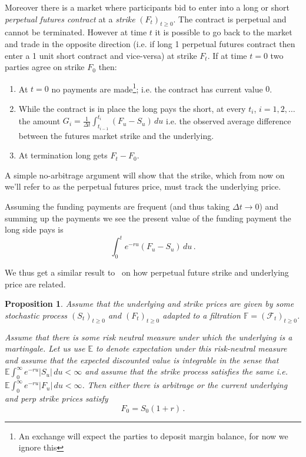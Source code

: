 \documentclass[10pt]{article}
\newtheorem{proposition}{Proposition}
\begin{document}
Moreover there is a market where participants bid to enter into a long or short {\em perpetual futures contract} at a {\em strike} $(F_t)_{t\geq 0}$.  
The contract is perpetual and cannot be terminated. 
However at time $t$ it is possible to go back to the market and trade in the opposite direction (i.e. if long 1 perpetual futures contract then enter a 1 unit short contract and vice-versa) at strike $F_t$.   
If at time $t=0$ two parties agree on strike $F_0$ then:
\begin{enumerate}
\item At $t=0$ no payments are made\footnote{An exchange will expect the parties to deposit margin balance, for now we ignore this}; i.e. the contract has current value $0$.
\item While the contract is in place the long pays the short, at every $t_i$, $i=1,2,\ldots$ the amount $G_i = \frac1{\Delta t}\int_{t_{i-1}}^{t_i} (F_u - S_u) \,du $ i.e. the observed average difference  between the futures market strike and the underlying. 
\item At termination long gets $F_t - F_0$. 
\end{enumerate}  



A simple no-arbitrage argument will show that the strike, which from now on we'll refer to as the perpetual futures price, must track the underlying price. 

Assuming the funding payments are frequent (and thus taking $\Delta t \to 0$) and summing up the payments we see the present value of the funding payment the long side pays is 
\[
\int_0^t e^{-ru} (F_u - S_u)\,du\,.
\]

We thus get a similar result to~\cite{he:fundamentals} on how perpetual future strike and underlying price are related.

\begin{proposition}
\label{prop price tracking}
Assume that the underlying and strike prices are given by some stochastic process $(S_t)_{t\geq 0}$ and $(F_t)_{t\geq 0}$ adapted to a filtration $\mathbb F = (\mathcal F_t)_{t\geq 0}$.



Assume that there is some risk neutral measure under which the underlying is a martingale. 
Let us use $\mathbb E$ to denote expectation under this risk-neutral measure
and assume that the expected discounted value is integrable in the sense that $\mathbb E \int_0^\infty e^{-ru} |S_u|\,du < \infty$ and assume that the strike process satisfies the same i.e. $\mathbb E\int_0^\infty e^{-ru} |F_u|\,du < \infty$. 
Then either there is arbitrage or the current underlying and perp strike prices satisfy 
\[
F_0 = S_0(1+r)\,.
\]
\end{proposition}
\end{document}

